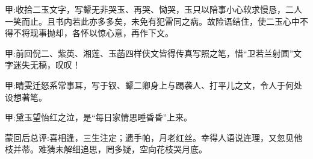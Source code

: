 \begin{parag}
    \begin{note}甲:收拾二玉文字，写颦无非哭玉、再哭、恸哭，玉只以陪事小心软求慢恳，二人一笑而止。且书内若此亦多多矣，未免有犯雷同之病。故险语结住，使二玉心中不得不将现事抛却，各怀以惊心意，再作下文。\end{note}
\end{parag}


\begin{parag}
    \begin{note}甲:前回倪二、紫英、湘莲、玉菡四样侠文皆得传真写照之笔，惜“卫若兰射圃”文字迷失无稿，叹叹！\end{note}
\end{parag}


\begin{parag}
    \begin{note}甲:晴雯迁怒系常事耳，写于钗、颦二卿身上与踢袭人、打平儿之文，令人于何处设想著笔。\end{note}
\end{parag}


\begin{parag}
    \begin{note}甲:黛玉望怡红之泣，是“每日家情思睡昏昏”上来。\end{note}
\end{parag}


\begin{parag}
    \begin{note}蒙回后总评:喜相逢，三生注定；遗手帕，月老红丝。幸得人语说连理，又忽见他枝并蒂。难猜未解细追思，罔多疑，空向花枝哭月底。\end{note}
\end{parag}

